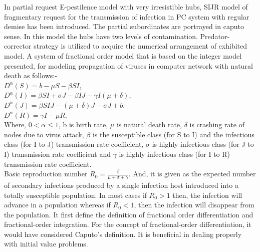 In partial request E-pestilence model with very irresistible hubs, SIJR model of fragmentary request for the transmission of infection in PC system with regular demise has been introduced. The partial subordinates are portrayed in caputo sense. In this model the hubs have two levels of contamination. Predator-corrector strategy is utilized to acquire the numerical arrangement of exhibited model.
A system of fractional order model that is based on the integer model presented, for modeling propagation of viruses in computer network with natural death as follows:- \\
\noindent
$D^{\alpha} (S) = b-\mu S - \beta S I$,  \\
$D^{\alpha} (I)= \beta S I + \sigma J - \beta I J - \gamma I (\mu + \delta)$, \\
$ D^{\alpha} (J)= \beta S I J - (\mu + \delta) J - \sigma J + b $, \\
$ D^{\alpha} (R)= \gamma I - \mu R$. \\
Where, $0 < \alpha \leq 1$,
b is birth rate, $\mu$ is natural death rate, $\delta$ is crashing rate of nodes due to virus attack, $\beta$ is the susceptible class (for S to I) and the infectious class (for I to J) transmission rate coefficient, $\sigma$ is highly infectious class (for J to I) transmission rate coefficient and $\gamma$ is highly infectious class (for I to R) transmission rate coefficient.\\
Basic reproduction number $R_0 = \frac{\beta}{\mu+\sigma+\gamma}$. And, it is given as the expected number of secondary infections produced by a single infection host introduced into a totally susceptible population. In most cases if $R_0 > 1$ then, the infection will advance in a population whereas if $R_0 < 1$, then the infection will disappear from the population.
It first define the definition of fractional order differentiation and fractional-order integration. For the concept of fractional-order differentiation, it would have considered Caputo's definition. It is beneficial in dealing properly with initial value problems.

